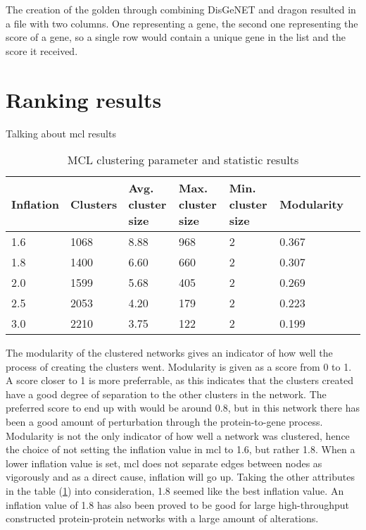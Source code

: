 The creation of the \gls{golden} through combining DisGeNET and \gls{dragon}
resulted in a file with two columns. One representing a gene, the second one
representing the score of a gene, so a single row would contain a unique gene in
the list and the score it received.

\section{Ranking results}
Talking about \gls{mcl} results
\begin{table}[H]
    \centering
    \begin{tabular}{| l | p{2cm} | p{2cm} | p{2cm} | p{2cm} | p{2cm} | p{2.1cm} |}
        \hline
        \textbf{Inflation} & \textbf{Clusters} & \textbf{Avg.  cluster size} &
        \textbf{Max. cluster size} & \textbf{Min. cluster size} &
        \textbf{Modularity} \\
        \hline
        1.6 & 1068 & 8.88 & 968 & 2 & 0.367 \\
        1.8 & 1400 & 6.60 & 660 & 2 & 0.307 \\
        2.0 & 1599 & 5.68 & 405 & 2 & 0.269 \\
        2.5 & 2053 & 4.20 & 179 & 2 & 0.223 \\
        3.0 & 2210 & 3.75 & 122 & 2 & 0.199 \\
        \hline
    \end{tabular}
    \caption{MCL clustering parameter and statistic results}
    \label{tab:mcl-inflation}
\end{table}
The modularity of the clustered networks gives an indicator of how well the
process of creating the clusters went. Modularity is given as a score from 0 to
1. A score closer to 1 is more preferrable, as this indicates that the clusters
created have a good degree of separation to the other clusters in the network.
The preferred score to end up with would be around 0.8, but in this network
there has been a good amount of perturbation through the protein-to-gene
process. Modularity is not the only indicator of how well a network was
clustered, hence the choice of not setting the inflation value in \gls{mcl} to
1.6, but rather 1.8. When a lower inflation value is set, \gls{mcl} does not
separate edges between nodes as vigorously and as a direct cause, inflation will
go up. Taking the other attributes in the table (\ref{tab:mcl-inflation}) into
consideration, 1.8 seemed like the best inflation value. An inflation value of
1.8 has also been proved to be good for large high-throughput constructed
protein-protein networks with a large amount of alterations\cite{mcl-inflation}.

